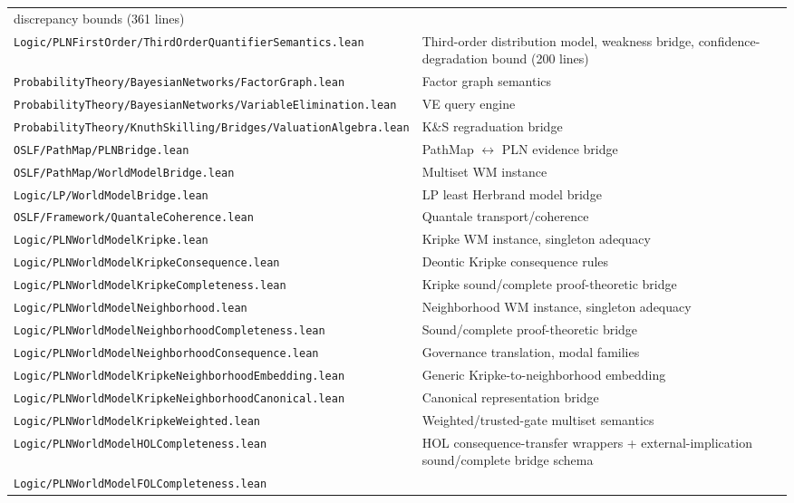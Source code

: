 \documentclass[]{article}
\newcommand{\code}[1]{\texttt{#1}}
\begin{document}
\begin{longtable}{p{}p{}}
  discrepancy bounds (361 lines) \\
\code{Logic/PLNFirstOrder/ThirdOrderQuantifierSemantics.lean} &
  Third-order distribution model, weakness bridge,
  confidence-degradation bound (200 lines) \\
\code{ProbabilityTheory/BayesianNetworks/FactorGraph.lean} & Factor graph
  semantics \\
\code{ProbabilityTheory/BayesianNetworks/VariableElimination.lean} & VE
  query engine \\
\code{ProbabilityTheory/KnuthSkilling/Bridges/ValuationAlgebra.lean} &
  K\&S regraduation bridge \\
\code{OSLF/PathMap/PLNBridge.lean} & PathMap $\leftrightarrow$ PLN
  evidence bridge \\
\code{OSLF/PathMap/WorldModelBridge.lean} & Multiset WM instance \\
\code{Logic/LP/WorldModelBridge.lean} & LP least Herbrand model bridge \\
\code{OSLF/Framework/QuantaleCoherence.lean} & Quantale
  transport/coherence \\
\code{Logic/PLNWorldModelKripke.lean} & Kripke WM instance,
  singleton adequacy \\
\code{Logic/PLNWorldModelKripkeConsequence.lean} & Deontic Kripke
  consequence rules \\
\code{Logic/PLNWorldModelKripkeCompleteness.lean} & Kripke
  sound/complete proof-theoretic bridge \\
\code{Logic/PLNWorldModelNeighborhood.lean} & Neighborhood WM instance,
  singleton adequacy \\
\code{Logic/PLNWorldModelNeighborhoodCompleteness.lean} &
  Sound/complete proof-theoretic bridge \\
\code{Logic/PLNWorldModelNeighborhoodConsequence.lean} & Governance
  translation, modal families \\
\code{Logic/PLNWorldModelKripkeNeighborhoodEmbedding.lean} &
  Generic Kripke-to-neighborhood embedding \\
\code{Logic/PLNWorldModelKripkeNeighborhoodCanonical.lean} &
  Canonical representation bridge \\
\code{Logic/PLNWorldModelKripkeWeighted.lean} &
  Weighted/trusted-gate multiset semantics \\
\code{Logic/PLNWorldModelHOLCompleteness.lean} &
  HOL consequence-transfer wrappers +
  external-implication sound/complete bridge schema \\
\code{Logic/PLNWorldModelFOLCompleteness.lean} &

\end{longtable}
\end{document}
